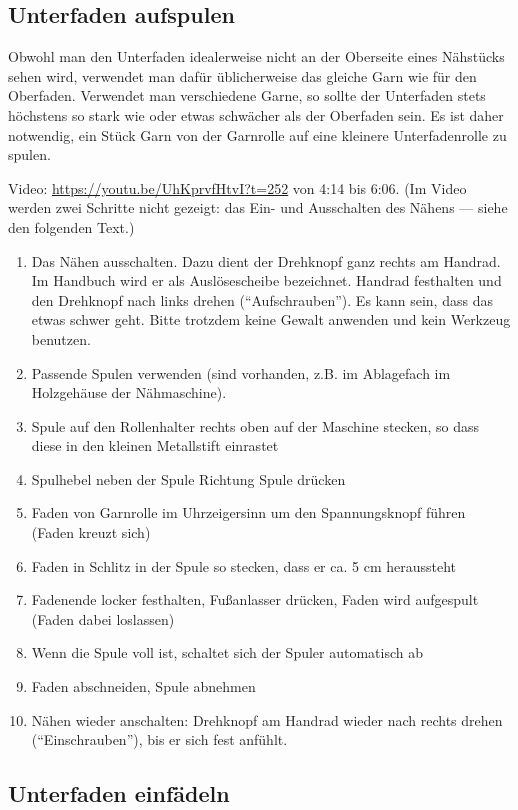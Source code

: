 \documentclass{\basedir/fablab-document}
\begin{document}
\subsection{Unterfaden aufspulen}
Obwohl man den Unterfaden idealerweise nicht an der Oberseite eines Nähstücks sehen wird, verwendet man dafür üblicherweise das gleiche Garn wie für den Oberfaden.
Verwendet man verschiedene Garne, so sollte der Unterfaden stets höchstens so stark wie oder etwas schwächer als der Oberfaden sein.
Es ist daher notwendig, ein Stück Garn von der Garnrolle auf eine kleinere Unterfadenrolle zu spulen.

Video: \url{https://youtu.be/UhKprvfHtvI?t=252} von 4:14 bis 6:06. (Im Video werden zwei Schritte nicht gezeigt: das Ein- und Ausschalten des Nähens --- siehe den folgenden Text.)

\begin{enumerate}
	\item Das Nähen ausschalten. Dazu dient der Drehknopf ganz rechts am Handrad. Im Handbuch wird er als Auslösescheibe bezeichnet. Handrad festhalten und den Drehknopf nach links drehen (\enquote{Aufschrauben}). Es kann sein, dass das etwas schwer geht. Bitte trotzdem keine Gewalt anwenden und kein Werkzeug benutzen.
	\item Passende Spulen verwenden (sind vorhanden, z.B. im Ablagefach im Holzgehäuse der Nähmaschine).
	\item Spule auf den Rollenhalter rechts oben auf der Maschine stecken, so dass diese in den kleinen Metallstift einrastet
	\item Spulhebel neben der Spule Richtung Spule drücken
	\item Faden von Garnrolle im Uhrzeigersinn um den Spannungsknopf führen (Faden kreuzt sich)
	\item Faden in Schlitz in der Spule so stecken, dass er ca. 5 cm heraussteht
	\item Fadenende locker festhalten, Fußanlasser drücken, Faden wird aufgespult (Faden dabei loslassen)
	\item Wenn die Spule voll ist, schaltet sich der Spuler automatisch ab
	\item Faden abschneiden, Spule abnehmen
	\item Nähen wieder anschalten: Drehknopf am Handrad wieder nach rechts drehen (\enquote{Einschrauben}), bis er sich fest anfühlt.
\end{enumerate}


\subsection{Unterfaden einfädeln}
\end{document}
